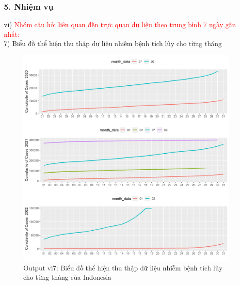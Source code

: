 \documentclass[english,10pt,table]{beamer}
\begin{document}
\begin{frame}[fragile]
\frametitle{5.  Nhiệm vụ}
vi) \textcolor{red}{Nhóm câu hỏi liên quan đến trực quan dữ liệu theo trung bình 7 ngày gần nhất:}\\
    7) Biểu đồ thể hiện thu thập dữ liệu nhiễm bệnh tích lũy cho từng tháng
	\begin{figure}[h!]
	\begin{center}
		    \includegraphics[scale = 0.26]{Images/VI/vi7 Indonesia .jpeg}
		     \caption{Output vi7: Biểu đồ thể hiện thu thập dữ liệu nhiễm bệnh tích lũy cho từng tháng của Indonesia}
		\end{center}
		\end{figure}
\end{frame}
\end{document}
